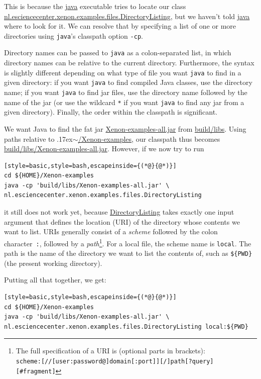\documentclass[12pt, a4paper, twoside, openany, titlepage]{book}
\newcommand{\mytilde}{\raise.17ex\hbox{$\scriptstyle\sim$}}
\begin{document}
This is because the \url{java} executable tries to locate our class \url{nl.esciencecenter.xenon.examples.files.DirectoryListing}, but we haven't told \url{java} where to look for it. We can resolve that by specifying a list of one or more directories using \texttt{java}'s classpath option \texttt{-cp}.

Directory names can be passed to \texttt{java} as a colon-separated list, in which directory names can be relative to the current directory. Furthermore, the syntax is slightly different depending on what type of file you want \texttt{java} to find in a given directory: if you want \texttt{java} to find compiled Java classes, use the directory name; if you want \texttt{java} to find jar files, use the directory name followed by the name of the jar (or use the wildcard \texttt{*} if you want \texttt{java} to find any jar from a given directory). Finally, the order within the classpath is significant.


We want Java to find the fat jar \url{Xenon-examples-all.jar} from \url{build/libs}. Using paths relative to \mytilde\url{/Xenon-examples}, our classpath thus becomes \url{build/libs/Xenon-examples-all.jar}. However, if we now try to run
\begin{lstlisting}[style=basic,style=bash,escapeinside={(*@}{@*)}]
cd ${HOME}/Xenon-examples
java -cp 'build/libs/Xenon-examples-all.jar' \
nl.esciencecenter.xenon.examples.files.DirectoryListing
\end{lstlisting}
it still does not work yet, because \url{DirectoryListing} takes exactly one input argument that defines the location (URI) of the directory whose contents we want to list. URIs generally consist of a \textit{scheme} followed by the colon character~\texttt{:}, followed by a \textit{path}\footnote{The full specification of a URI is (optional parts in brackets): \\ \texttt{scheme:[//[user:password@]domain[:port]][/]path[?query][#fragment]}\label{footnote:format-uri}}. For a local file, the scheme name is \texttt{local}. The path is the name of the directory we want to list the contents of, such as \texttt{\$\{PWD\}} (the present working directory).

Putting all that together, we get:

\begin{lstlisting}[style=basic,style=bash,escapeinside={(*@}{@*)}]
cd ${HOME}/Xenon-examples
java -cp 'build/libs/Xenon-examples-all.jar' \
nl.esciencecenter.xenon.examples.files.DirectoryListing local:${PWD}
\end{lstlisting} \label{snip:directory-listing-local}
\end{document}
